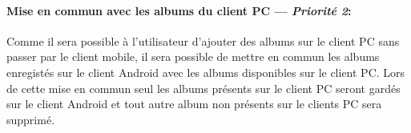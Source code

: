 \paragraph{Mise en commun avec les albums du client PC ---  \textit{Priorité 2}:} 
Comme il sera possible à l'utilisateur d'ajouter des albums sur le client PC sans passer par le client mobile, il sera possible de mettre en commun les albums enregistés sur le client Android avec les albums disponibles sur le client PC.
Lors de cette mise en commun seul les albums présents sur le client PC seront gardés sur le client Android et tout autre album non présents sur le clients PC sera supprimé.  

